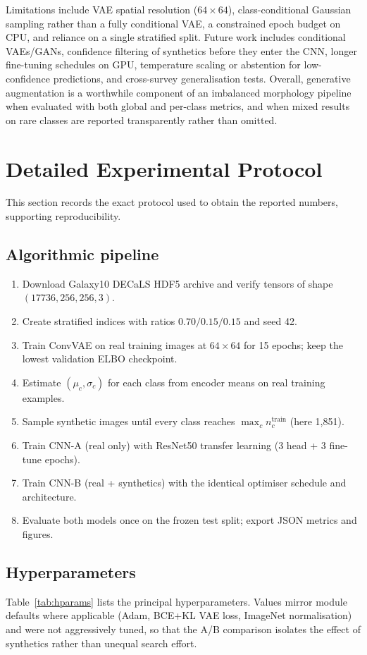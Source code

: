 \documentclass[conference]{IEEEtran}
\begin{document}
Limitations include VAE spatial resolution ($64\times64$), class-conditional Gaussian sampling rather than a fully conditional VAE, a constrained epoch budget on CPU, and reliance on a single stratified split. Future work includes conditional VAEs/GANs, confidence filtering of synthetics before they enter the CNN, longer fine-tuning schedules on GPU, temperature scaling or abstention for low-confidence predictions, and cross-survey generalisation tests. Overall, generative augmentation is a worthwhile component of an imbalanced morphology pipeline when evaluated with both global and per-class metrics, and when mixed results on rare classes are reported transparently rather than omitted.

\section{Detailed Experimental Protocol}
\label{sec:protocol}
This section records the exact protocol used to obtain the reported numbers, supporting reproducibility.

\subsection{Algorithmic pipeline}
\begin{enumerate}
\item Download Galaxy10 DECaLS HDF5 archive and verify tensors of shape $(17736,256,256,3)$.
\item Create stratified indices with ratios $0.70/0.15/0.15$ and seed 42.
\item Train ConvVAE on real training images at $64\times64$ for 15 epochs; keep the lowest validation ELBO checkpoint.
\item Estimate $(\mu_c,\sigma_c)$ for each class from encoder means on real training examples.
\item Sample synthetic images until every class reaches $\max_c n_c^{\mathrm{train}}$ (here 1{,}851).
\item Train CNN-A (real only) with ResNet50 transfer learning (3 head + 3 fine-tune epochs).
\item Train CNN-B (real + synthetics) with the identical optimiser schedule and architecture.
\item Evaluate both models once on the frozen test split; export JSON metrics and figures.
\end{enumerate}

\subsection{Hyperparameters}
Table~\ref{tab:hparams} lists the principal hyperparameters. Values mirror module defaults where applicable (Adam, BCE+KL VAE loss, ImageNet normalisation) and were not aggressively tuned, so that the A/B comparison isolates the effect of synthetics rather than unequal search effort.
\end{document}
